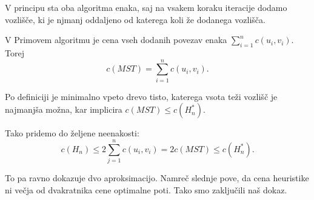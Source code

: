 \documentclass[fleqn]{article}
\begin{document}
V principu sta oba algoritma enaka, saj na vsakem koraku iteracije dodamo vozlišče, ki je njmanj oddaljeno od katerega koli že dodanega vozlišča.

V Primovem algoritmu je cena vseh dodanih povezav enaka $\sum_{i=1}^{n} c(u_i, v_i)$. Torej 
$$ c(MST) = \sum_{i=1}^{n} c(u_i, v_i) \text{.} $$

Po definiciji je minimalno vpeto drevo tisto, katerega vsota teži vozlišč je najmanjša možna, kar implicira $c(MST) \leq c (H_n^*)$.

Tako pridemo do željene neenakosti:
$$ c (H_n) \leq 2 \sum_{j=1}^{n} c(u_i, v_i) = 2 c(MST) \leq c (H_n^*) \text{.} $$

To pa ravno dokazuje dvo aproksimacijo. Namreč slednje pove, da cena heuristike ni večja od dvakratnika cene optimalne poti.
Tako smo zaključili naš dokaz. 
\end{document}
